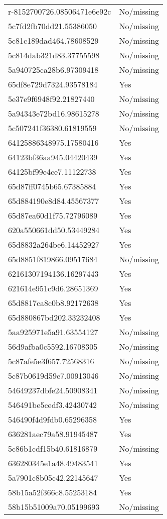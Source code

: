 \begin{tabular}{ll}
r-8152700726.08506471e6e92c & No/missing \\
5c7fd2fb70dd21.55386050 & No/missing \\
5c81c189dad464.78608529 & No/missing \\
5c814dab321d83.37755598 & No/missing \\
5a940725ca28b6.97309418 & No/missing \\
65df8e729d7324.93578184 & Yes \\
5e37e9f6948f92.21827440 & No/missing \\
5a94343e72bd16.98615278 & No/missing \\
5c507241f36380.61819559 & No/missing \\
64125886348975.17580416 & Yes \\
64123bf36aa945.04420439 & Yes \\
64125bf99e4ce7.11122738 & Yes \\
65d87ff0745b65.67385884 & Yes \\
65d884190e8d84.45567377 & Yes \\
65d87ea60d1f75.72796089 & Yes \\
620a550661dd50.53449284 & Yes \\
65d8832a264be6.14452927 & Yes \\
65d8851f819866.09517684 & No/missing \\
62161307194136.16297443 & Yes \\
621614e951c9d6.28651369 & Yes \\
65d8817ca8c0b8.92172638 & Yes \\
65d880867bd202.33232408 & Yes \\
5aa925971e5a91.63554127 & No/missing \\
56d9afba0c5592.16708305 & No/missing \\
5c87afe5e3f657.72568316 & No/missing \\
5c87b0619d59e7.00913046 & No/missing \\
54649237dbfe24.50908341 & No/missing \\
546491be5cedf3.42430742 & No/missing \\
546490f4d9fdb0.65296358 & Yes \\
636281aec79a58.91945487 & Yes \\
5c86b1cdf15b40.61816879 & No/missing \\
636280345e1a48.49483541 & Yes \\
5a7901c8b05c42.22145647 & Yes \\
58b15a52f366c8.55253184 & Yes \\
58b15b51009a70.05199693 & No/missing \\

\end{tabular}
